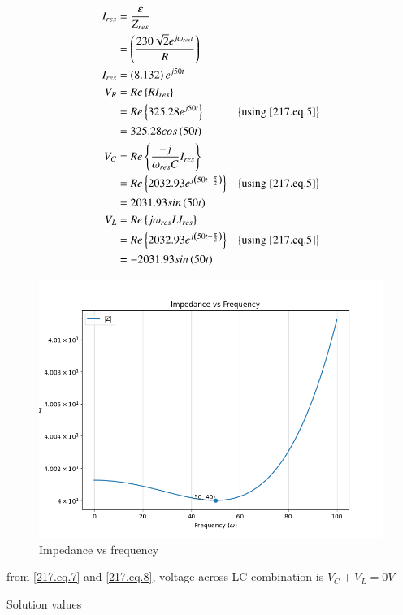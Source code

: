 \documentclass[journal,12pt,twocolumn]{IEEEtran}
\begin{document}
\begin{align}
    I_{res} & = \frac{\varepsilon}{Z_{res}}\\
    & = \left(\frac{230\sqrt{2}e^{j\omega_{res}t}}{R}\right)\label{217.eq.6}\\
    I_{res} & = \left(8.132\right)e^{j50t}\label{217.eq.5}\\
    V_R & = Re\left\{RI_{res}\right\}\\
    & = Re\left\{325.28e^{j50t}\right\} &\left\{\text{using \eqref{217.eq.5}}\right\}\\
    & = 325.28 cos\left(50t\right)\\
    V_C & = Re\left\{\frac{-j}{\omega_{res}C}I_{res}\right\}\\
    & = Re\left\{2032.93 e^{j\left(50t - \frac{\pi}{2}\right)}\right\} &\left\{\text{using \eqref{217.eq.5}}\right\}\\
    & = 2031.93 sin\left(50t\right) \label{217.eq.7}\\
    V_L& = Re\left\{j\omega_{res}LI_{res}\right\}\\
    & = Re\left\{2032.93e^{j\left(50t + \frac{\pi}{2}\right)}\right\} &\left\{\text{using \eqref{217.eq.5}}\right\}\\
    & = - 2031.93 sin\left(50t\right) \label{217.eq.8}
\end{align}

\begin{figure}[h]
     \centering
	\includegraphics[width=\columnwidth]{figs/impedance.png}
     \caption{Impedance vs frequency}
     \label{217.fig.3}
\end{figure}

from \eqref{217.eq.7} and \eqref{217.eq.8}, voltage across LC combination is $V_C + V_L = 0 V$
\begin{table}[h]
    \centering
    
    \caption{Solution values}
    \label{tab:217.tab.2}
\end{table}
\end{document}
